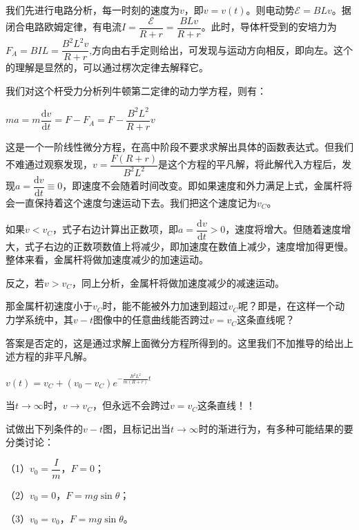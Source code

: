 \documentclass{ctexbook}
\begin{document}
	我们先进行电路分析，每一时刻的速度为$v$，即$v=v(t)$。则电动势$\mathcal{E}=BLv$。据闭合电路欧姆定律，有电流$I=\dfrac{\mathcal{E}}{R+r}=\dfrac{BLv}{R+r}$。此时，导体杆受到的安培力为$F_A=BIL=\dfrac{B^2L^2v}{R+r}$,方向由右手定则给出，可发现与运动方向相反，即向左。这个的理解是显然的，可以通过楞次定律去解释它。
	
	我们对这个杆受力分析列牛顿第二定律的动力学方程，则有：
	
	\centerline{$ma=m\dfrac{\mathrm{d}v}{\mathrm{d}t}=F-F_A=F-\dfrac{B^2L^2}{R+r} v$}
	
	这是一个一阶线性微分方程，在高中阶段不要求求解出具体的函数表达式。但我们不难通过观察发现，$v=\dfrac{F(R+r)}{B^2L^2}$是这个方程的平凡解，将此解代入方程后，发现$a=\dfrac{\mathrm{d}v}{\mathrm{d}t} \equiv 0$，即速度不会随着时间改变。即如果速度和外力满足上式，金属杆将会一直保持着这个速度匀速运动下去。我们把这个速度记为$v_C$。
	
	如果$v<v_C$，式子右边计算出正数项，即$a=\dfrac{\mathrm{d}v}{\mathrm{d}t} > 0$，速度将增大。但随着速度增大，式子右边的正数项数值上将减少，即加速度在数值上减少，速度增加得更慢。整体来看，金属杆将做加速度减少的加速运动。
	
	反之，若$v>v_C$，同上分析，金属杆将做加速度减少的减速运动。
	
	那金属杆初速度小于$v_C$时，能不能被外力加速到超过$v_C$呢？即是，在这样一个动力学系统中，其$v-t$图像中的任意曲线能否跨过$v=v_C$这条直线呢？
	
	答案是否定的，这是通过求解上面微分方程所得到的。这里我们不加推导的给出上述方程的非平凡解。
	
	\centerline{$v(t)=v_C+(v_0-v_C)e^{-\frac{B^2 L^2}{m(R+r)} t}$}
	
	当$t \rightarrow \infty $时，$v \rightarrow v_C$，但永远不会跨过$v=v_C$这条直线！！
	
	试做出下列条件的$v-t$图，且标记出当$t \rightarrow \infty $时的渐进行为，有多种可能结果的要分类讨论：
	
	（1）$v_0=\dfrac{I}{m}$，$F=0$；
	
	（2）$v_0=0$，$F=mg \sin \theta$；
	
	（3）$v_0=v_0$，$F=mg \sin \theta$。
	\hspace*{\fill}
	
	\hspace*{\fill}
	
	\hspace*{\fill}
	
	\hspace*{\fill}
	
	\hspace*{\fill}
	
\end{document}
